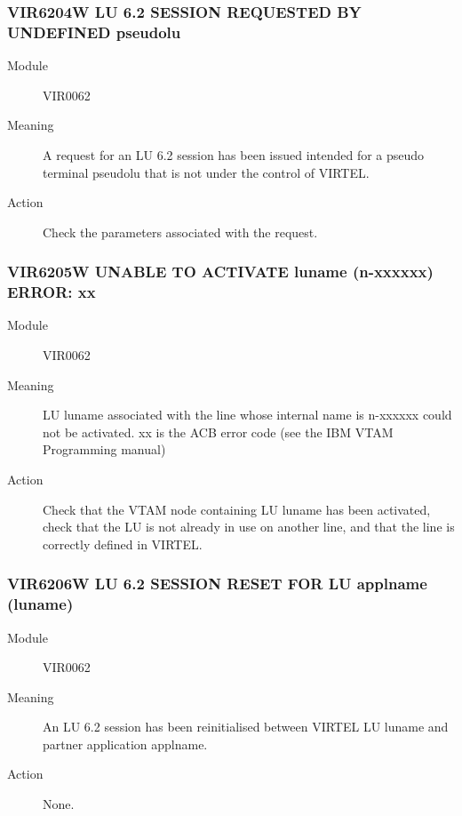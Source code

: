 \documentclass[letterpaper,10pt,english]{sphinxmanual}
\begin{document}
\subsubsection{VIR6204W LU 6.2 SESSION REQUESTED BY UNDEFINED pseudolu}
\label{\detokenize{messages:vir6204w-lu-6-2-session-requested-by-undefined-pseudolu}}\begin{description}
\item[{Module}] \leavevmode
VIR0062

\item[{Meaning}] \leavevmode
A request for an LU 6.2 session has been issued intended for a pseudo terminal pseudolu that is not under the control of VIRTEL.

\item[{Action}] \leavevmode
Check the parameters associated with the request.

\end{description}


\subsubsection{VIR6205W UNABLE TO ACTIVATE luname (n-xxxxxx) ERROR: xx}
\label{\detokenize{messages:vir6205w-unable-to-activate-luname-n-xxxxxx-error-xx}}\begin{description}
\item[{Module}] \leavevmode
VIR0062

\item[{Meaning}] \leavevmode
LU luname associated with the line whose internal name is n-xxxxxx could not be activated. xx is the ACB error code (see the IBM VTAM Programming manual)

\item[{Action}] \leavevmode
Check that the VTAM node containing LU luname has been activated, check that the LU is not already in use on another line, and that the line is correctly defined in VIRTEL.

\end{description}


\subsubsection{VIR6206W LU 6.2 SESSION RESET FOR LU applname (luname)}
\label{\detokenize{messages:vir6206w-lu-6-2-session-reset-for-lu-applname-luname}}\begin{description}
\item[{Module}] \leavevmode
VIR0062

\item[{Meaning}] \leavevmode
An LU 6.2 session has been reinitialised between VIRTEL LU luname and partner application applname.

\item[{Action}] \leavevmode
None.

\end{description}
\end{document}
